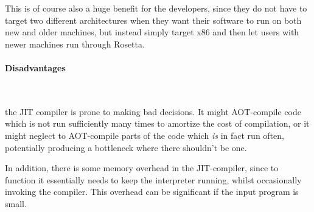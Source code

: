 \medskip

This is of course also a huge benefit for the developers, since they do not have
to target two different architectures when they want their software to run on
both new and older machines, but instead simply target x86 and then let users
with newer machines run through Rosetta.

\paragraph{Disadvantages}~\smallskip

the JIT compiler is prone to making bad decisions. It might AOT-compile code
which is not run sufficiently many times to amortize the cost of compilation, or
it might neglect to AOT-compile parts of the code which \emph{is} in fact run
often, potentially producing a bottleneck where there shouldn't be one.

\medskip

In addition, there is some memory overhead in the JIT-compiler, since to
function it essentially needs to keep the interpreter running, whilst
occasionally invoking the compiler. This overhead can be significant if the input
program is small.

\Sectend
